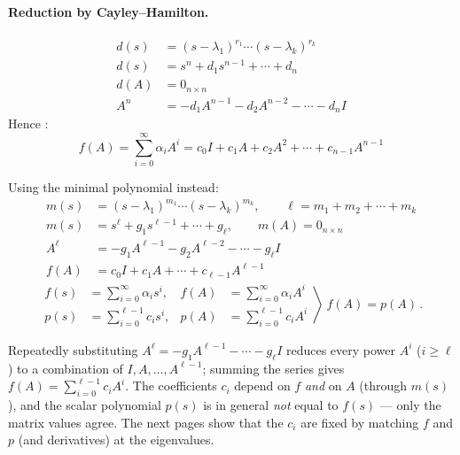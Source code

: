 \paragraph{Reduction by Cayley--Hamilton.}
\begin{align*}
d(s) &= (s-\lambda_1)^{r_1}\cdots(s-\lambda_k)^{r_k}\\
d(s) &= s^n + d_1 s^{n-1} + \cdots + d_n\\
d(A) &= 0_{n\times n}\\
A^n &= -d_1A^{n-1} - d_2A^{n-2} - \cdots - d_nI
\end{align*}
Hence :
\[
f(A) = \sum_{i=0}^{\infty}\alpha_i A^i = c_0I + c_1A + c_2A^2 + \cdots + c_{n-1}A^{n-1}
\]

Using the minimal polynomial instead:
\begin{align*}
m(s) &= (s-\lambda_1)^{m_1}\cdots(s-\lambda_k)^{m_k}, \qquad \ell = m_1 + m_2 + \cdots + m_k\\
m(s) &= s^\ell + g_1 s^{\ell-1} + \cdots + g_\ell, \qquad m(A) = 0_{n\times n}\\
A^\ell &= -g_1A^{\ell-1} - g_2A^{\ell-2} - \cdots - g_\ell I\\
f(A) &= c_0I + c_1A + \cdots + c_{\ell-1}A^{\ell-1}
\end{align*}
\[
\left.\begin{aligned}
f(s) &= \sum_{i=0}^{\infty}\alpha_i s^i, & f(A) &= \sum_{i=0}^{\infty}\alpha_i A^i\\
p(s) &= \sum_{i=0}^{\ell-1}c_i s^i, & p(A) &= \sum_{i=0}^{\ell-1}c_i A^i
\end{aligned}\right\rangle
\ \boxed{f(A) = p(A)}\,.
\]
\begin{insight}
Repeatedly substituting $A^\ell = -g_1A^{\ell-1}-\cdots-g_\ell I$ reduces every power $A^i$ ($i\geq\ell$) to a combination of $I,A,\dots,A^{\ell-1}$; summing the series gives $f(A)=\sum_{i=0}^{\ell-1}c_iA^i$. The coefficients $c_i$ depend on $f$ \emph{and} on $A$ (through $m(s)$), and the scalar polynomial $p(s)$ is in general \emph{not} equal to $f(s)$ --- only the matrix values agree. The next pages show that the $c_i$ are fixed by matching $f$ and $p$ (and derivatives) at the eigenvalues.
\end{insight}

